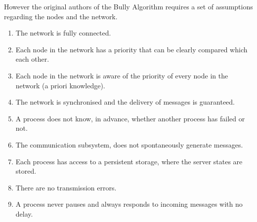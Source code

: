 \documentclass[dareport.tex]{subfiles}
\begin{document}
However the original authors of the Bully Algorithm requires a set of assumptions regarding the nodes and the network\cite{election}.
\begin{enumerate}
	\item The network is fully connected.\label{assumption:1}
	\item Each node in the network has a priority that can be clearly compared which each other.\label{assumption:2}
	\item Each node in the network is aware of the priority of every node in the network (a priori knowledge).\label{assumption:3}
	\item The network is synchronised and the delivery of messages is guaranteed.\label{assumption:4}
	\item A process does not know, in advance, whether another process has failed or not.\label{assumption:5}
	\item The communication subsystem, does not spontaneously generate messages.\label{assumption:6}
	\item Each process has access to a persistent storage, where the server states are stored.\label{assumption:7}
	\item There are no transmission errors.\label{assumption:8}
	\item A process never pauses and always responds to incoming messages with no delay.\label{assumption:9}
\end{enumerate}
\end{document}
